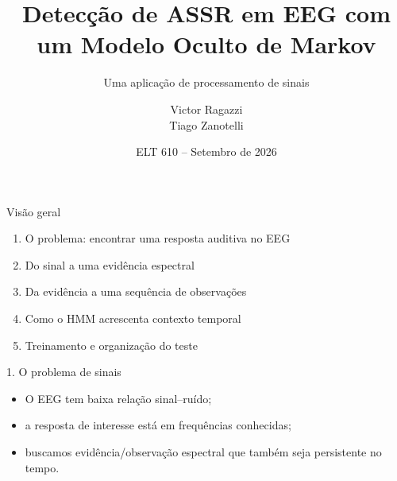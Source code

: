 \documentclass{beamer}
\begin{document}
\title{Detec\c{c}\~ao de ASSR em EEG com um Modelo Oculto de Markov}
\subtitle{Uma aplica\c{c}\~ao de processamento de sinais}
\author{Victor Ragazzi\\[1.2em]Tiago Zanotelli}
\date{ELT 610 -- Setembro de 2026}
\frame{\titlepage}

\begin{frame}{Vis\~ao geral}
\Large
\begin{enumerate}
  \item O problema: encontrar uma resposta auditiva no EEG
  \item Do sinal a uma evid\^encia espectral
  \item Da evid\^encia a uma sequ\^encia de observa\c{c}\~oes
  \item Como o HMM acrescenta contexto temporal
  \item Treinamento e organiza\c{c}\~ao do teste
\end{enumerate}

\end{frame}

\begin{frame}{1. O problema de sinais}
\Large

\vspace{0.35cm}
\begin{itemize}
  \item O EEG tem baixa rela\c{c}\~ao sinal--ru\'ido;
  \item a resposta de interesse est\'a em frequ\^encias conhecidas;
  \item buscamos evidência/observação espectral que tamb\'em seja persistente no tempo.
\end{itemize}

\begin{center}
\end{center}
\end{frame}
\end{document}
